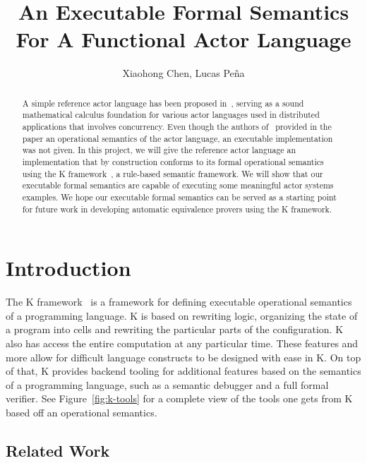 \documentclass{llncs}
\begin{document}
%
\mainmatter              %
%
\title{An Executable Formal Semantics For A Functional Actor Language}
%
\author{Xiaohong Chen, Lucas Pe\~{n}a}
%

\maketitle              %

\begin{abstract}
A simple reference actor language has been proposed in~\cite{}, serving as a
sound mathematical calculus foundation for various actor languages used in
distributed applications that involves concurrency. Even though the authors
of~\cite{} provided in the paper an operational semantics of the actor language,
an executable implementation was not given. In this project, we will give the
reference actor language an implementation that by construction conforms to its
formal operational semantics using the K framework~\cite{}, a rule-based
semantic framework. We will show that our executable formal semantics are
capable of executing some meaningful actor systems examples. We hope our
executable formal semantics can be served as a starting point for future work in
developing automatic equivalence provers using the K framework.
\end{abstract}
%
\section{Introduction}
The K framework~\cite{} is a framework for defining executable operational
semantics of a programming language. K is based on rewriting logic, organizing
the state of a program into cells and rewriting the particular parts of the
configuration. K also has access the entire computation at any particular
time. These features and more allow for difficult language constructs to be
designed with ease in K. On top of that, K provides backend tooling for
additional features based on the semantics of a programming language, such as a
semantic debugger and a full formal verifier. See Figure~\ref{fig:k-tools} for a
complete view of the tools one gets from K based off an operational semantics.

\subsection{Related Work}
\end{document}
